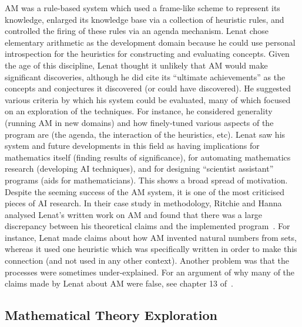 AM was a rule-based system which used a frame-like scheme to represent
its knowledge, enlarged its knowledge base via a collection of
heuristic rules, and controlled the firing of these rules via an
agenda mechanism. Lenat chose elementary arithmetic as the development
domain because he could use personal introspection for the heuristics
for constructing and evaluating concepts. Given the age of this
discipline, Lenat thought it unlikely that AM would make significant
discoveries, although he did cite its ``ultimate achievements'' as the
concepts and conjectures it discovered (or could have discovered). He
suggested various criteria by which his system could be evaluated,
many of which focused on an exploration of the techniques. For
instance, he considered generality (running AM in new domains) and how
finely-tuned various aspects of the program are (the agenda, the
interaction of the heuristics, etc). %
Lenat saw his system and future developments in this field as having
implications for mathematics itself (finding results of significance),
for automating mathematics research (developing AI techniques), and
for designing ``scientist assistant'' programs (aids for
mathematicians). This shows a broad spread of motivation. Despite the
seeming success of the AM system, it is one of the most criticised
pieces of AI research. In their case study in methodology, Ritchie and
Hanna analysed Lenat's written work on AM and found that there was a
large discrepancy between his theoretical claims and the implemented
program~\cite{partridge}. For instance, Lenat made claims about how AM
invented natural numbers from sets, whereas it used one heuristic
which was specifically written in order to make this connection (and
not used in any other context). Another problem was that the processes
were sometimes under-explained. For an argument of why many of the
claims made by Lenat about AM were false, see chapter 13 of~\cite{colton:book}.

\subsection{Mathematical Theory Exploration}
\label{section:mte}

